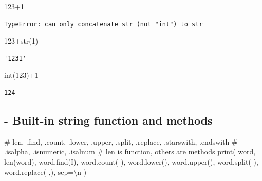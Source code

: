 \documentclass[
  letterpaper,
  DIV=11,
  numbers=noendperiod]{scrreprt}
\newenvironment{Shaded}{\begin{snugshade}}{\end{snugshade}}
\newcommand{\BuiltInTok}[1]{\textcolor[rgb]{0.00,0.23,0.31}{#1}}
\newcommand{\CharTok}[1]{\textcolor[rgb]{0.13,0.47,0.30}{#1}}
\newcommand{\CommentTok}[1]{\textcolor[rgb]{0.37,0.37,0.37}{#1}}
\newcommand{\DecValTok}[1]{\textcolor[rgb]{0.68,0.00,0.00}{#1}}
\newcommand{\NormalTok}[1]{\textcolor[rgb]{0.00,0.23,0.31}{#1}}
\newcommand{\OperatorTok}[1]{\textcolor[rgb]{0.37,0.37,0.37}{#1}}
\newcommand{\StringTok}[1]{\textcolor[rgb]{0.13,0.47,0.30}{#1}}
\begin{document}
\begin{Shaded}
\begin{Highlighting}[]
\CommentTok{\textquotesingle{}123\textquotesingle{}}\OperatorTok{+}\DecValTok{1}
\end{Highlighting}
\end{Shaded}

\begin{verbatim}
TypeError: can only concatenate str (not "int") to str
\end{verbatim}

\begin{Shaded}
\begin{Highlighting}[]
\CommentTok{\textquotesingle{}123\textquotesingle{}}\OperatorTok{+}\BuiltInTok{str}\NormalTok{(}\DecValTok{1}\NormalTok{)}
\end{Highlighting}
\end{Shaded}

\begin{verbatim}
'1231'
\end{verbatim}

\begin{Shaded}
\begin{Highlighting}[]
\BuiltInTok{int}\NormalTok{(}\StringTok{\textquotesingle{}123\textquotesingle{}}\NormalTok{)}\OperatorTok{+}\DecValTok{1}
\end{Highlighting}
\end{Shaded}

\begin{verbatim}
124
\end{verbatim}

\subsection{- Built-in string function and
methods}\label{built-in-string-function-and-methods}

\begin{Shaded}
\begin{Highlighting}[]
\CommentTok{\# len, .find, .count, .lower, .upper, .split, .replace, .starswith, .endswith}
\CommentTok{\# .isalpha, .isnumeric, .isalnum}
\CommentTok{\# len is function, others are methods}
\BuiltInTok{print}\NormalTok{(}
\NormalTok{    word,}
    \BuiltInTok{len}\NormalTok{(word),}
\NormalTok{    word.find(}\StringTok{\textquotesingle{}I\textquotesingle{}}\NormalTok{),}
\NormalTok{    word.count(}\StringTok{\textquotesingle{} \textquotesingle{}}\NormalTok{),}
\NormalTok{    word.lower(),}
\NormalTok{    word.upper(),}
\NormalTok{    word.split(}\StringTok{\textquotesingle{} \textquotesingle{}}\NormalTok{),}
\NormalTok{    word.replace(}\StringTok{\textquotesingle{} \textquotesingle{}}\NormalTok{,}\StringTok{\textquotesingle{}{-}\textquotesingle{}}\NormalTok{),}
\NormalTok{    sep}\OperatorTok{=}\StringTok{\textquotesingle{}}\CharTok{\textbackslash{}n}\StringTok{\textquotesingle{}}
\NormalTok{)}
\end{Highlighting}
\end{Shaded}
\end{document}
